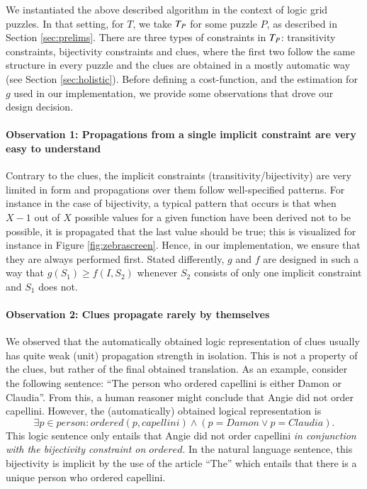 We instantiated the above described algorithm in the context of logic grid puzzles. 
In that setting, for $T$, we take $T_P$ for some puzzle $P$, as described in Section \ref{sec:prelims}. There are three types of constraints in $T_P$: transitivity constraints, bijectivity constraints and clues, where the first two follow the same structure in every puzzle and the clues are obtained in a mostly automatic way (see Section \ref{sec:holistic}). 
Before defining a cost-function, and the estimation for $g$ used in our implementation, we provide some observations that drove our design decision. 

\paragraph{Observation 1: Propagations from a single implicit constraint are very easy to understand} Contrary to the clues, the implicit constraints (transitivity/bijectivity) are very limited in form and propagations over them follow well-specified patterns. 
For instance in the case of bijectivity, a typical pattern that occurs is that when $X-1$ out of $X$ possible values for a given function have been derived not to be possible, it is propagated that the last value should be true; this is visualized for instance in Figure \ref{fig:zebrascreen}. 
Hence, in our implementation, we ensure that they are always performed first. Stated differently, $g$ and $f$ are designed in such a way that $g(S_1)\geq f(I,S_2)$ whenever $S_2$ consists of only one implicit constraint and $S_1$ does not. 

\paragraph{Observation 2: Clues propagate rarely by themselves}
We observed that the automatically obtained logic representation of clues usually has quite weak (unit) propagation strength in isolation. 
This is not a property of the clues, but rather of the final obtained translation. As an example, consider the following sentence: 
``The person who ordered capellini is either Damon or Claudia''. From this, a human reasoner might conclude that Angie did not order capellini. 
However, the (automatically) obtained logical representation is 
\[\exists p\in \mathit{person}: \mathit{ordered}(p, \mathit{capellini})\land (p =  \mathit{Damon}\lor p =  \mathit{Claudia}).\]
This logic sentence only entails that Angie did not order capellini \emph{in conjunction with the bijectivity constraint on $ \mathit{ordered}$}.
In the natural language sentence, this bijectivity is implicit by the use of the article ``The'' which entails that there is a unique person who ordered capellini. 

